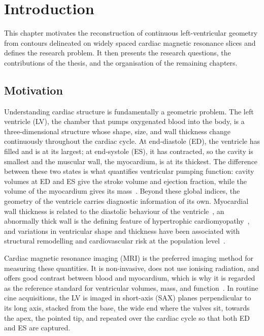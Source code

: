 
\chapter{Introduction}
\label{ch:introduction}

\noindent
This chapter motivates the reconstruction of continuous left-ventricular
geometry from contours delineated on widely spaced cardiac magnetic resonance
slices and defines the research problem. It then presents
the research questions, the contributions of the thesis, and the organisation
of the remaining chapters.

\section{Motivation}
\label{sec:motivation}
\noindent
Understanding cardiac structure is fundamentally a geometric problem. The
left ventricle (LV), the chamber that pumps oxygenated blood into the body, is
a three-dimensional structure whose shape, size, and wall thickness change
continuously throughout the cardiac cycle. At end-diastole (ED), the ventricle
has filled and is at its largest; at end-systole (ES), it has contracted, so
the cavity is smallest and the muscular wall, the myocardium, is at its
thickest. The difference between these two states is what quantifies
ventricular pumping function: cavity volumes at ED and ES give the stroke
volume and ejection fraction, while the volume of the myocardium gives its
mass~\parencite{bernard2018acdc}. Beyond these global indices, the geometry of
the ventricle carries diagnostic information of its own. Myocardial wall
thickness is related to the diastolic behaviour of the ventricle~\parencite{grossman1974wallthickness}, an abnormally thick wall is the defining
feature of hypertrophic cardiomyopathy~\parencite{ommen2020hcm}, and
variations in ventricular shape and thickness have been associated with
structural remodelling and cardiovascular risk at the population level~\parencite{medrano2014lvshapevariation,demarvao2014atlas}.

Cardiac magnetic resonance imaging (MRI) is the preferred imaging method for
measuring these quantities. It is non-invasive, does not use ionising
radiation, and offers good contrast between blood and myocardium, which is why
it is regarded as the reference standard for ventricular volumes, mass, and
function~\parencite{petitjean2011segmentationreview,bernard2018acdc}. In
routine cine acquisitions, the LV is imaged in short-axis (SAX) planes
perpendicular to its long axis, stacked from the base, the wide end where the
valves sit, towards the apex, the pointed tip, and repeated over the cardiac
cycle so that both ED and ES are captured.

